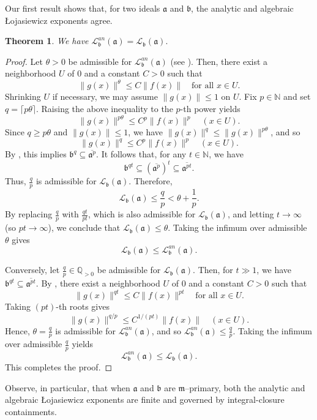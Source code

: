 \documentclass[12pt]{amsart}
\newcommand{\NN}{\mathbb{N}}
\newcommand{\QQ}{\mathbb{Q}}
\newcommand{\m}{\mathfrak m}
\renewcommand{\a}{\mathfrak{a}}
\renewcommand{\b}{\mathfrak{b}}
\newcommand{\Loj}{\mathcal{L}} %
\theoremstyle{plain}
\newtheorem{theorem}{Theorem}[section]
\theoremstyle{definition}
\numberwithin{equation}{section}
\begin{document}
Our first result shows that, for two ideals $\a$ and $\b$, the analytic and algebraic \L{}ojasiewicz exponents agree.

\begin{theorem}\label{thm:analytic-agreement}
	We have
	$\mathcal L^{an}_{\b}(\a)=\Loj_{\b}(\a).$
\end{theorem}

\begin{proof} Let $\theta>0$ be admissible for $\mathcal L^{an}_{\b}(\a)$ (see ).
	Then, there exist a neighborhood $U$ of $0$ and a constant $C>0$ such that
	\[
	\|g(x)\|^{\theta}\le C\|f(x)\|\quad \text{for all }x\in U.
	\]
	Shrinking $U$ if necessary, we may assume $\|g(x)\|\le 1$ on $U$.
	Fix $p\in\NN$ and set $q=\lceil p\theta\rceil$.
	Raising the above inequality to the $p$-th power yields
	\[
	\|g(x)\|^{p\theta}\le C^{p}\|f(x)\|^{p}\quad (x\in U).
	\]
	Since $q\ge p\theta$ and $\|g(x)\|\le 1$, we have $\|g(x)\|^{q}\le \|g(x)\|^{p\theta}$, and so
	\[
	\|g(x)\|^{q}\le C^{p}\|f(x)\|^{p}\quad (x\in U).
	\]
	By , this implies $\b^{q}\subseteq \overline{\a^{p}}.$
	It follows that, for any $t \in \NN$, we have 
	\[
	\b^{qt} \subseteq \left(\overline{\a^p}\right)^t \subseteq \overline{\a^{pt}}.
	\]
	Thus, $\frac{q}{p}$ is admissible for $\Loj_{\b}(\a)$. Therefore, 
	$$\Loj_{\b}(\a)\le \frac{q}{p} < \theta+\frac1p.$$
	By replacing $\frac{q}{p}$ with $\frac{qt}{pt}$, which is also admissible for $\Loj_{\b}(\a)$, and letting $t \rightarrow \infty$ (so $pt \rightarrow \infty$), we conclude that $\Loj_{\b}(\a)\le \theta$. Taking the infimum over admissible $\theta$ gives 
	$$\Loj_{\b}(\a)\le \Loj^{an}_{\b}(\a).$$
	
	Conversely, let $\frac{q}{p}\in\QQ_{>0}$ be admissible for $\Loj_{\b}(\a)$. Then, for $t \gg 1$, we have $\b^{qt}\subseteq \overline{\a^{pt}}.$
	By , there exist a neighborhood $U$ of $0$ and a constant $C>0$ such that
	\[
	\|g(x)\|^{qt}\le C\|f(x)\|^{pt}\quad \text{for all }x\in U.
	\]
	Taking $(pt)$-th roots gives
	\[
	\|g(x)\|^{q/p}\le C^{1/(pt)}\|f(x)\|\quad (x\in U).
	\]
	Hence, $\theta=\frac{q}{p}$ is admissible for $\mathcal L^{an}_{\b}(\a)$, and so
	$\mathcal L^{an}_{\b}(\a)\le \frac{q}{p}$.
	Taking the infimum over admissible $\frac{q}{p}$ yields
	$$\mathcal L^{an}_{\b}(\a)\le \Loj_{\b}(\a).$$
This completes the proof.
\end{proof}

Observe, in particular, that when $\a$ and $\b$ are $\m$--primary, both the analytic and algebraic \L{}ojasiewicz exponents are finite and governed by integral-closure containments.
\end{document}
